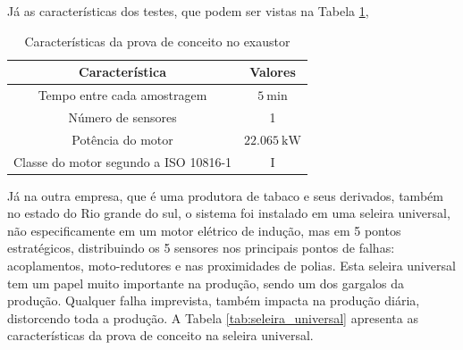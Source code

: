 Já as características dos testes, que podem ser vistas na Tabela \ref{tab:exautor}, 

\begin{table}[H]
    \caption{Características da prova de conceito no exaustor}
    \label{tab:exautor}
    \centering%
    \begin{minipage}{.55\textwidth}
      \begin{tabular*}{\textwidth}{c|c}
        \hline
        Característica                          & Valores                                    \\ \hline
        \hline
        Tempo entre cada amostragem             &  $\SI{5}{\minute}$                         \\
        Número de sensores                      &  1                                         \\ 
        Potência do motor                       &  $\SI{22.065}{\kilo\watt}$                      \\
        Classe do motor segundo a  ISO 10816-1  &  I                                         \\
      \end{tabular*}
    \end{minipage}
  \end{table}


Já na outra empresa, que é uma produtora de tabaco e seus derivados, também no estado do Rio grande do sul, o sistema foi instalado em uma 
seleira universal, não especificamente em um motor elétrico de indução, mas em 5 pontos estratégicos, distribuindo os 5 sensores nos principais pontos 
de falhas: acoplamentos, moto-redutores e nas proximidades de polias. Esta seleira universal tem um papel muito importante na produção, sendo um dos gargalos
da produção. Qualquer falha imprevista, também impacta na produção diária, distorcendo toda a produção. A Tabela \ref{tab:seleira_universal} apresenta 
as características da prova de conceito na seleira universal.

